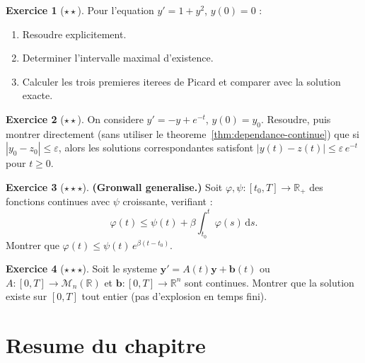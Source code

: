 \documentclass[12pt,a4paper,openany]{book}
\theoremstyle{definition}
\newtheorem{exercice}{Exercice}[chapter]
\theoremstyle{plain}
\theoremstyle{remark}
\newcommand{\R}{\mathbb{R}}
\newcommand{\dd}{\mathrm{d}}
\newcommand{\abs}[1]{\left|#1\right|}
\begin{document}
\begin{exercice}[$\star\star$]\label{exo:explosion-temps}
Pour l'equation $y' = 1 + y^2$, $y(0) = 0$ :
\begin{enumerate}[label=(\alph*)]
  \item Resoudre explicitement.
  \item Determiner l'intervalle maximal d'existence.
  \item Calculer les trois premieres iterees de Picard et comparer avec la solution exacte.
\end{enumerate}
\end{exercice}

\begin{exercice}[$\star\star$]\label{exo:dependance-ci}
On considere $y' = -y + e^{-t}$, $y(0) = y_0$. Resoudre, puis montrer directement (sans utiliser le theoreme~\ref{thm:dependance-continue}) que si $\abs{y_0 - z_0} \leq \varepsilon$, alors les solutions correspondantes satisfont $\abs{y(t) - z(t)} \leq \varepsilon \, e^{-t}$ pour $t \geq 0$.
\end{exercice}

\begin{exercice}[$\star\star\star$]\label{exo:gronwall-generalise}
\textbf{(Gronwall generalise.)} Soit $\varphi, \psi : [t_0, T] \to \R_+$ des fonctions continues avec $\psi$ croissante, verifiant :
\[
  \varphi(t) \leq \psi(t) + \beta \int_{t_0}^{t} \varphi(s)\, \dd s.
\]
Montrer que $\varphi(t) \leq \psi(t) \, e^{\beta(t - t_0)}$.
\end{exercice}

\begin{exercice}[$\star\star\star$]\label{exo:cauchy-lipschitz-systeme}
Soit le systeme $\mathbf{y}' = A(t)\mathbf{y} + \mathbf{b}(t)$ ou $A : [0,T] \to \mathcal{M}_n(\R)$ et $\mathbf{b} : [0,T] \to \R^n$ sont continues. Montrer que la solution existe sur $[0, T]$ tout entier (pas d'explosion en temps fini).
\end{exercice}

\section*{Resume du chapitre}
\end{document}
